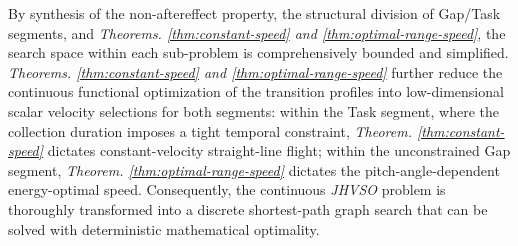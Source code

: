 By synthesis of the non-aftereffect property, the structural division of Gap/Task segments, and \textit{Theorems. \ref{thm:constant-speed} and \ref{thm:optimal-range-speed}}, the search space within each sub-problem is comprehensively bounded and simplified.
\textit{Theorems. \ref{thm:constant-speed} and \ref{thm:optimal-range-speed}} further reduce the continuous functional optimization of the transition profiles into low-dimensional scalar velocity selections for both segments: within the Task segment, where the collection duration imposes a tight temporal constraint, \textit{Theorem. \ref{thm:constant-speed}} dictates constant-velocity straight-line flight; within the unconstrained Gap segment, \textit{Theorem. \ref{thm:optimal-range-speed}} dictates the pitch-angle-dependent energy-optimal speed.
Consequently, the continuous \textit{JHVSO} problem is thoroughly transformed into a discrete shortest-path graph search that can be solved with deterministic mathematical optimality.




 
